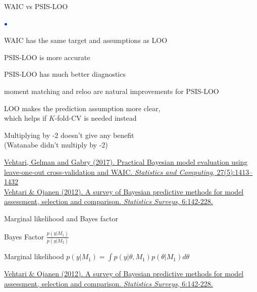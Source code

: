 \documentclass[english,t]{beamer}
\newenvironment{list1}{
   \begin{list}{$\color{list1}\bullet$}{\itemsep=6pt}}{
  \end{list}}
\begin{document}
\begin{frame}{WAIC vs PSIS-LOO}

\begin{list1}
  \item<+-> WAIC has the same target and assumptions as LOO
  \item<+-> PSIS-LOO is more accurate 
  \item<+-> PSIS-LOO has much better diagnostics
  \item<+-> moment matching and reloo are natural improvements for PSIS-LOO
  \item<5-> LOO makes the prediction assumption more clear,\\ which
    helps if $K$-fold-CV is needed instead
  \item<6-> Multiplying by -2 doesn't give any benefit\\ (Watanabe
    didn't multiply by -2)
\end{list1}

\vspace{\baselineskip}
{\color{gray}\footnotesize \href{http://link.springer.com/article/10.1007/s11222-016-9696-4}{Vehtari, Gelman and Gabry (2017). Practical Bayesian model evaluation using leave-one-out cross-validation and WAIC. \textit{Statistics and Computing}, 27(5):1413–1432}\\
\href{http://dx.doi.org/10.1214/12-SS102}{Vehtari \& Ojanen (2012). A survey of Bayesian predictive methods for model assessment, selection and comparison. \textit{Statistics Surveys}, 6:142-228.}}

\end{frame}

\begin{frame}[fragile]{Marginal likelihood and Bayes factor}

  Bayes Factor $\frac{p(y|M_1)}{p(y|M_2)}$

  Marginal likelihood $p(y|M_1) = \int p(y|\theta,M_1)p(\theta|M_1)d\theta$


\vspace{4\baselineskip}
{\color{gray}\footnotesize
  \href{http://dx.doi.org/10.1214/12-SS102}{Vehtari \& Ojanen (2012). A survey of Bayesian predictive methods for model assessment, selection and comparison. \textit{Statistics Surveys}, 6:142-228.}}

\end{frame}
\end{document}
